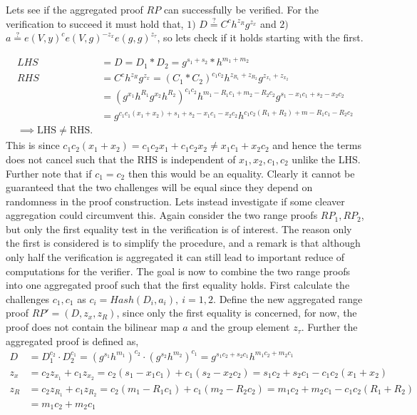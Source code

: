 
Lets see if the  aggregated proof $RP$ can successfully be verified. For the verification to succeed it must hold that, $1)$ $D\overset{?}{=} C^ch^{z_R}g^{z_x}$ and $2)$ $ a \overset{?}{=} e(V,y)^ce(V,g)^{-z_x}e(g,g)^{z_\tau}$, so lets check if it holds starting with the first.

\begin{align*}
LHS &= D = D_1*D_2 = g^{s_1+s_2}*h^{m_1+m_2} \\
RHS &= C^ch^{z_R}g^{z_x} = (C_1*C_2)^{c_1c_2}h^{z_{R_1}+z_{R_2}}g^{z_{x_1}+z_{x_2}} \\ 
&=(g^{x_1}h^{R_1}g^{x_2}h^{R_2}) ^{c_1c_2}  h^{m_1-R_1c_1+m_2-R_2c_2} g^{s_1- x_1c_1+s_2-x_2c_2} \\
&= g^{c_1c_1(x_1+x_2)+s_1+s_2-x_1c_1-x_2c_2}h^{c_1c_2(R_1+R_2)+m-R_1c_1-R_2c_2} \\
\implies \text{LHS}\neq \text{RHS}.
\end{align*}
This is since $ c_1c_2(x_1+x_2) = c_1c_2x_1+c_1c_2x_2 \neq x_1c_1 + x_2c_2$ and hence the terms does not cancel such that the RHS is independent of $x_1,x_2,c_1,c_2$ unlike the LHS. Further note that if $c_1=c_2$ then this would be an equality. Clearly it cannot be guaranteed that the two challenges will be equal since they depend on randomness in the proof construction. Lets instead investigate if some cleaver aggregation could circumvent this. Again consider the two range proofs $RP_1,RP_2$, but only the first equality test in the verification  is of interest. The reason only the first is considered is to simplify the procedure, and a remark is that although only half the verification is aggregated it can still lead to important reduce of computations for the verifier. The goal is now to combine the two range proofs into one aggregated proof such that the first equality holds. First calculate the challenges $c_1,c_1$ as $c_i =Hash(D_i,a_i),\:i=1,2$.
Define the new aggregated range proof  $RP' =(D,z_x,z_R)$, since only the first equality is concerned, for now, the proof does not contain the bilinear map $a$ and the group element $z_{\tau}$. Further the aggregated proof is defined as, 
\begin{align*}
D &= D_1^{c_2}\cdot D_2^{c_1} = (g^{s_1}h^{m_1}) ^{c_2} \cdot (g^{s_2}h^{m_2}) ^{c_1}  =g^{s_1c_2+s_2c_1}h^{m_1c_2+m_2c_1} \\
z_x &= c_2z_{x_1} +c_1 z_{x_2} = c_2(s_1-x_1c_1)  + c_1(s_2-x_2c_2) = s_1c_2 + s_2c_1 -c_1c_2(x_1+x_2)\\
z_R &= c_2z_{R_1} +c_1 z_{R_2} = c_2(m_1-R_1c_1)  + c_1(m_2-R_2c_2) = m_1c_2 + m_2c_1 -c_1c_2(R_1+R_2)\\
&= m_1c_2 + m_2c_1\\
\end{align*}
